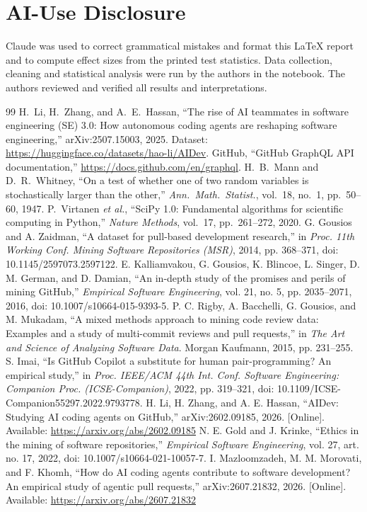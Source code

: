 \documentclass[conference]{IEEEtran}
\begin{document}
\section*{AI-Use Disclosure}
Claude was used to correct grammatical mistakes and format this LaTeX report and to compute effect sizes from the printed test statistics. Data collection, cleaning and statistical analysis were run by the authors in the notebook. The authors reviewed and verified all results and interpretations.

\begin{thebibliography}{99}
 H.~Li, H.~Zhang, and A.~E.~Hassan, ``The rise of AI teammates in software engineering (SE) 3.0: How autonomous coding agents are reshaping software engineering,'' arXiv:2507.15003, 2025. Dataset: \url{https://huggingface.co/datasets/hao-li/AIDev}.
 GitHub, ``GitHub GraphQL API documentation,'' \url{https://docs.github.com/en/graphql}.
 H.~B.~Mann and D.~R.~Whitney, ``On a test of whether one of two random variables is stochastically larger than the other,'' \emph{Ann.\ Math.\ Statist.}, vol.~18, no.~1, pp.~50--60, 1947.
 P.~Virtanen \emph{et al.}, ``SciPy 1.0: Fundamental algorithms for scientific computing in Python,'' \emph{Nature Methods}, vol.~17, pp.~261--272, 2020.
G. Gousios and A. Zaidman, ``A dataset for pull-based development research,'' in \emph{Proc. 11th Working Conf. Mining Software Repositories (MSR)}, 2014, pp. 368--371, doi: 10.1145/2597073.2597122.
E. Kalliamvakou, G. Gousios, K. Blincoe, L. Singer, D. M. German, and D. Damian, ``An in-depth study of the promises and perils of mining GitHub,'' \emph{Empirical Software Engineering}, vol. 21, no. 5, pp. 2035--2071, 2016, doi: 10.1007/s10664-015-9393-5.
P. C. Rigby, A. Bacchelli, G. Gousios, and M. Mukadam, ``A mixed methods approach to mining code review data: Examples and a study of multi-commit reviews and pull requests,'' in \emph{The Art and Science of Analyzing Software Data}. Morgan Kaufmann, 2015, pp. 231--255.
S. Imai, ``Is GitHub Copilot a substitute for human pair-programming? An empirical study,'' in \emph{Proc. IEEE/ACM 44th Int. Conf. Software Engineering: Companion Proc. (ICSE-Companion)}, 2022, pp. 319--321, doi: 10.1109/ICSE-Companion55297.2022.9793778.
H. Li, H. Zhang, and A. E. Hassan, ``AIDev: Studying AI coding agents on GitHub,'' arXiv:2602.09185, 2026. [Online]. Available: \url{https://arxiv.org/abs/2602.09185}
N. E. Gold and J. Krinke, ``Ethics in the mining of software repositories,'' \emph{Empirical Software Engineering}, vol. 27, art. no. 17, 2022, doi: 10.1007/s10664-021-10057-7.
I. Mazloomzadeh, M. M. Morovati, and F. Khomh, ``How do AI coding agents contribute to software development? An empirical study of agentic pull requests,'' arXiv:2607.21832, 2026. [Online]. Available: \url{https://arxiv.org/abs/2607.21832}
\end{thebibliography}
\end{document}
